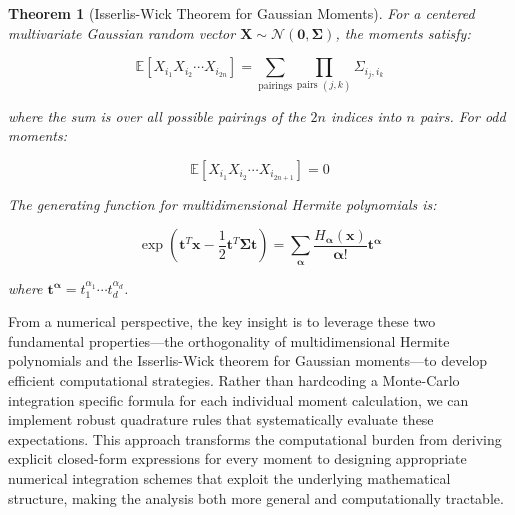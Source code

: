 \documentclass[a4paper]{article}
\theoremstyle{plain}
\newtheorem{theorem}{Theorem}[section]
\theoremstyle{definition}
\theoremstyle{remark}
\begin{document}
\begin{theorem}[Isserlis-Wick Theorem for Gaussian Moments]
\label{thm:isserlis_wick}
For a centered multivariate Gaussian random vector $\mathbf{X} \sim \mathcal{N}(\mathbf{0}, \boldsymbol{\Sigma})$, the moments satisfy:

\begin{equation}
\boxed{\mathbb{E}[X_{i_1} X_{i_2} \cdots X_{i_{2n}}] = \sum_{\text{pairings}} \prod_{\text{pairs } (j,k)} \Sigma_{i_j, i_k}} \label{eq:isserlis_wick_formula}
\end{equation}

where the sum is over all possible pairings of the $2n$ indices into $n$ pairs. For odd moments:

\begin{equation}
\boxed{\mathbb{E}[X_{i_1} X_{i_2} \cdots X_{i_{2n+1}}] = 0} \label{eq:odd_moments_zero}
\end{equation}

The generating function for multidimensional Hermite polynomials is:

\begin{equation}
\boxed{\exp\left(\mathbf{t}^T \mathbf{x} - \frac{1}{2}\mathbf{t}^T \boldsymbol{\Sigma} \mathbf{t}\right) = \sum_{\boldsymbol{\alpha}} \frac{H_{\boldsymbol{\alpha}}(\mathbf{x})}{\boldsymbol{\alpha}!} \mathbf{t}^{\boldsymbol{\alpha}}} \label{eq:multidim_generating_function}
\end{equation}

where $\mathbf{t}^{\boldsymbol{\alpha}} = t_1^{\alpha_1} \cdots t_d^{\alpha_d}$.
\end{theorem}
\begin{tcolorbox}[colback=green!5,colframe=green!80!black,title={\textbf{Ongoing research: Numerical Implementation Strategy}},enhanced,drop shadow,boxrule=2pt]
From a numerical perspective, the key insight is to leverage these two fundamental properties—the orthogonality of multidimensional Hermite 
polynomials and the Isserlis-Wick theorem for Gaussian moments—to develop efficient computational strategies. Rather than hardcoding 
a Monte-Carlo integration specific formula for each individual moment calculation, we can implement robust quadrature rules that systematically evaluate these 
expectations. This approach transforms the computational burden from deriving explicit closed-form expressions for every moment to designing 
appropriate numerical integration schemes that exploit the underlying mathematical structure, making the analysis both more general and 
computationally tractable.
\end{tcolorbox}
\end{document}
